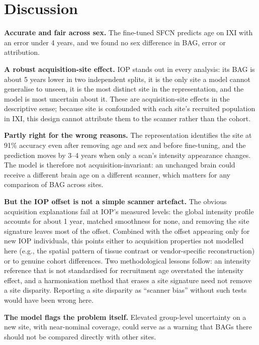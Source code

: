 \documentclass[conference]{IEEEtran}
\begin{document}
\section{Discussion}
\textbf{Accurate and fair across sex.} The fine-tuned SFCN predicts age on IXI with an error under 4 years, and we found no sex difference in BAG, error or attribution.

\textbf{A robust acquisition-site effect.} IOP stands out in every analysis: its BAG is about 5 years lower in two independent splits, it is the only site a model cannot generalise to unseen, it is the most distinct site in the representation, and the model is most uncertain about it. These are acquisition-site effects in the descriptive sense; because site is confounded with each site's recruited population in IXI, this design cannot attribute them to the scanner rather than the cohort.

\textbf{Partly right for the wrong reasons.} The representation identifies the site at 91\% accuracy even after removing age and sex and before fine-tuning, and the prediction moves by 3--4 years when only a scan's intensity appearance changes. The model is therefore not acquisition-invariant: an unchanged brain could receive a different brain age on a different scanner, which matters for any comparison of BAG across sites.

\textbf{But the IOP offset is not a simple scanner artefact.} The obvious acquisition explanations fail at IOP's measured levels: the global intensity profile accounts for about 1 year, matched smoothness for none, and removing the site signature leaves most of the offset. Combined with the offset appearing only for new IOP individuals, this points either to acquisition properties not modelled here (e.g., the spatial pattern of tissue contrast or vendor-specific reconstruction) or to genuine cohort differences. Two methodological lessons follow: an intensity reference that is not standardised for recruitment age overstated the intensity effect, and a harmonisation method that erases a site signature need not remove a site disparity. Reporting a site disparity as ``scanner bias'' without such tests would have been wrong here.

\textbf{The model flags the problem itself.} Elevated group-level uncertainty on a new site, with near-nominal coverage, could serve as a warning that BAGs there should not be compared directly with other sites.
\end{document}
